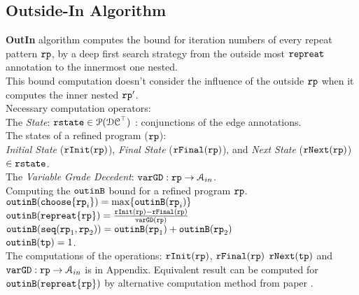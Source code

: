 \subsection{Outside-In Algorithm}
\label{sec:outinalg}
\textbf{OutIn} algorithm computes the bound for iteration numbers of every repeat pattern ${\mathtt{rp}}$,
by a deep first search strategy from the outside most ${\mathtt{repreat}}$ annotation
to the innermost one nested.
\\
This bound computation doesn't consider the influence of the outside ${\mathtt{rp}}$
when it computes the inner nested ${\mathtt{rp}}'$.
\\
Necessary computation operators:
\\
The \emph{State}: 
${\mathtt{rstate}} \in \mathcal{P}(\mathcal{DC}^{\top})$ : conjunctions of the edge annotations.
\\
The states of a refined program (${\mathtt{rp}}$):
\\
\emph{Initial State} (${\mathtt{rInit}}({\mathtt{rp}})$), 
\emph{Final State} (${\mathtt{rFinal}}({\mathtt{rp}})$), and \emph{Next State} (${\mathtt{rNext}}({\mathtt{rp}})$)  $\in {\mathtt{rstate}}$.
\\
The \emph{Variable Grade Decedent}: ${\mathtt{varGD}} : {\mathtt{rp}} \to \mathcal{A}_{in}$.
\\
Computing the ${\mathtt{outinB}}$ bound for a refined program ${\mathtt{rp}}$. 
\\
${\mathtt{outinB}}({\mathtt{choose}}\{{\mathtt{rp}}_i\}) =  \max\{{\mathtt{outinB}}({\mathtt{rp}}_i)\}$
\\
${\mathtt{outinB}}({\mathtt{repreat}}\{{\mathtt{rp}}\}) =  \frac{{\mathtt{rInit}}({\mathtt{rp}}) - {\mathtt{rFinal}}({\mathtt{rp}})}{{\mathtt{varGD}}({\mathtt{rp}})}$
\\
${\mathtt{outinB}}({\mathtt{seq}}({\mathtt{rp}}_1, {\mathtt{rp}}_2)) =  {\mathtt{outinB}}({\mathtt{rp}}_1)+ {\mathtt{outinB}}( {\mathtt{rp}}_2)$
\\
${\mathtt{outinB}}({\mathtt{tp}}) =  1$.
\\
The computations of the operations: ${\mathtt{rInit}}({\mathtt{rp}})$,
${\mathtt{rFinal}}({\mathtt{rp}})$ ${\mathtt{rNext}}({\mathtt{tp}})$ and ${\mathtt{varGD}} : {\mathtt{rp}} \to \mathcal{A}_{in}$ is in Appendix.
Equivalent result can be computed for ${\mathtt{outinB}}({\mathtt{repreat}}\{{\mathtt{rp}}\})$ by alternative computation method from paper \cite{GulwaniJK09}.

